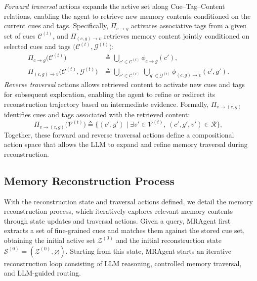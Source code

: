 \emph{Forward traversal} actions expands the active set along Cue--Tag--Content relations, enabling the agent to retrieve new memory contents conditioned on the current cues and tags. Specifically, $\Pi_{c\rightarrow g}$ activates associative tags from a given set
of cues $\mathcal{C}^{(t)}$, and $\Pi_{(c,g)\rightarrow v}$ retrieves memory
content jointly conditioned on selected cues and tags
$\big(\mathcal{C}^{(t)}, \mathcal{G}^{(t)}\big)$:
\begin{equation}
\label{eq:traversal-actions}
\begin{aligned}
\Pi_{c\rightarrow g}\!\big(\mathcal{C}^{(t)}\big)
&\triangleq
\bigcup_{c'\in \mathcal{C}^{(t)}} \phi_{c\rightarrow g}(c'), \\
\Pi_{(c,g)\rightarrow v}\!\big(\mathcal{C}^{(t)}, \mathcal{G}^{(t)}\big)
&\triangleq
\bigcup_{c'\in \mathcal{C}^{(t)}}\ \bigcup_{g'\in \mathcal{G}^{(t)}} \phi_{(c,g)\rightarrow v}(c',g').
\end{aligned}
\end{equation}
\emph{Reverse traversal} actions allows retrieved content to activate new cues and tags for subsequent exploration, enabling the agent to refine or redirect its
reconstruction trajectory based on intermediate evidence.
Formally, $\Pi_{v\rightarrow (c,g)}$ identifies cues and tags associated with the retrieved content:
\begin{equation}
\Pi_{v\rightarrow (c,g)}\!\big(\mathcal{V}^{(t)}\big)
\triangleq
\{(c',g')
\mid
\exists v'\in \mathcal{V}^{(t)},\ (c',g',v')\in \mathcal{R}\},
\end{equation}
Together, these forward and reverse traversal actions define a compositional action space that allows the LLM to expand and refine memory traversal during reconstruction.

\subsection{Memory Reconstruction Process}
\label{subsec:active-reconstruction}
With the reconstruction state and traversal actions defined, we detail the memory reconstruction process, which iteratively explores relevant memory contents through state updates and traversal actions.
Given a query, MRAgent first extracts a set of fine-grained cues and matches them against the stored cue set, obtaining the initial active set $\mathcal{Z}^{(0)}$ and the initial reconstruction state
\(
\mathcal{S}^{(0)} = (\mathcal{Z}^{(0)}, \varnothing).
\)
Starting from this state, MRAgent starts an iterative reconstruction loop consisting of LLM reasoning, controlled memory traversal, and LLM-guided routing.

